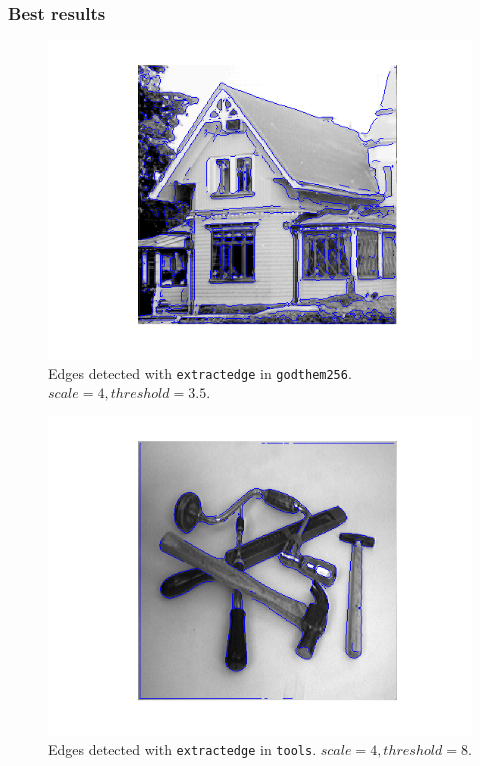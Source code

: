 \subsubsection{Best results}

\begin{figure}[H]
	\centering
	\includegraphics[scale=0.8]{./images/Q7/house/4_3.5.png}
	\caption{Edges detected with \texttt{extractedge} in \texttt{godthem256}. $scale = 4, threshold = 3.5$.}
	\label{fig:Q7_house_4_3.5}
\end{figure}

\begin{figure}[H]
	\centering
	\includegraphics[scale=0.8]{./images/Q7/tools/4_8.png}
	\caption{Edges detected with \texttt{extractedge} in \texttt{tools}. $scale = 4, threshold = 8$.}
	\label{fig:Q7_tools_4_8}
\end{figure}
